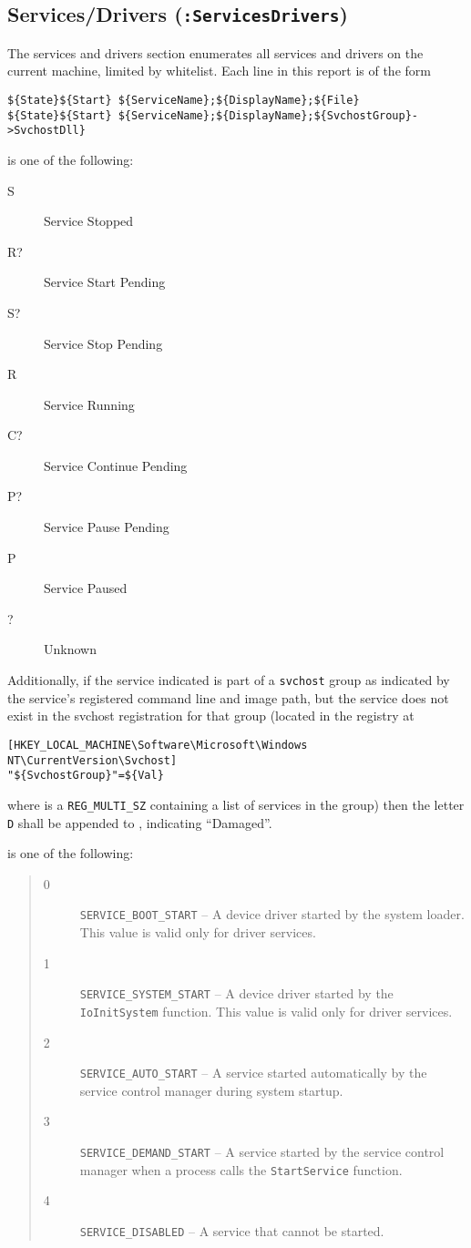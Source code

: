 \subsection{Services/Drivers (\texttt{:ServicesDrivers})}
The services and drivers section enumerates all services and drivers on the
current machine, limited by whitelist. Each line in this report is of the form
\begin{verbatim}
${State}${Start} ${ServiceName};${DisplayName};${File}
${State}${Start} ${ServiceName};${DisplayName};${SvchostGroup}->SvchostDll}
\end{verbatim}

\noindent{} is one of the following:
\begin{description}
\item[S] Service Stopped
\item[R?] Service Start Pending
\item[S?] Service Stop Pending
\item[R] Service Running
\item[C?] Service Continue Pending
\item[P?] Service Pause Pending
\item[P] Service Paused
\item[?] Unknown
\end{description}

Additionally, if the service indicated is part of a \verb|svchost| group as
indicated by the service's registered command line and image path, but the
service does not exist in the svchost registration for that group (located in
the registry at
\begin{verbatim}
[HKEY_LOCAL_MACHINE\Software\Microsoft\Windows NT\CurrentVersion\Svchost]
"${SvchostGroup}"=${Val}
\end{verbatim}
where  is a \verb|REG_MULTI_SZ| containing a list of services in the
group) then the letter \verb|D| shall be appended to , indicating
``Damaged''.

\noindent{} is one of the following:
\begin{quote}
\begin{description}
\item[0] \verb|SERVICE_BOOT_START| -- A device driver started by the system
loader. This value is valid only for driver services.
\item[1] \verb|SERVICE_SYSTEM_START| -- A device driver started by the
\verb|IoInitSystem| function. This value is valid only for driver services.
\item[2] \verb|SERVICE_AUTO_START| -- A service started automatically by the
service control manager during system startup.
\item[3] \verb|SERVICE_DEMAND_START| -- A service started by the service control
manager when a process calls the \verb|StartService| function.
\item[4] \verb|SERVICE_DISABLED| -- A service that cannot be started.
\end{description}
\end{quote}

